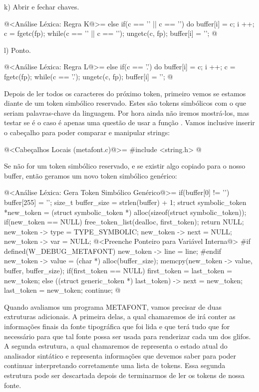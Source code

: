 k) Abrir e fechar chaves.

\iniciocodigo
@<Análise Léxica: Regra K@>=
else if(c == '{' || c == '}'){
  do{
    buffer[i] = c;
    i ++;
    c = fgetc(fp);
  } while(c == '{' || c == '}');
  ungetc(c, fp);
  buffer[i] = '\0';
}
@
\fimcodigo

l) Ponto.

\iniciocodigo
@<Análise Léxica: Regra L@>=
else if(c == '.'){
  do{
    buffer[i] = c;
    i ++;
    c = fgetc(fp);
  } while(c == '.');
  ungetc(c, fp);
  buffer[i] = '\0';
}
@
\fimcodigo


Depois de ler todos os caracteres do próximo token, primeiro vemos se
estamos diante de um token simbólico reservado. Estes são tokens
simbólicos com o que seriam palavras-chave da linguagem. Por hora
ainda não iremos mostrá-los, mas testar se é o caso é apenas uma
questão de usar a função . Vamos inclusive inserir
o cabeçalho para poder comparar e manipular strings:

\iniciocodigo
@<Cabeçalhos Locais (metafont.c)@>=
#include <string.h>
@
\fimcodigo

Se não for um token simbólico reservado, e se existir algo copiado
para o nosso buffer, então geramos um novo token simbólico genérico:

\iniciocodigo
@<Análise Léxica: Gera Token Simbólico Genérico@>=
if(buffer[0] != '\0'){
  buffer[255] = '\0';
  size_t buffer_size = strlen(buffer) + 1;
  struct symbolic_token *new_token =
     (struct symbolic_token *) alloc(sizeof(struct symbolic_token));
  if(new_token == NULL){
    free_token_list(dealloc, first_token);
    return NULL;
  }
  new_token -> type = TYPE_SYMBOLIC;
  new_token -> next = NULL;
  new_token -> var = NULL;
  @<Preenche Ponteiro para Variável Interna@>
#if defined(W_DEBUG_METAFONT)
  new_token -> line = line;
#endif
  new_token -> value = (char *) alloc(buffer_size);
  memcpy(new_token -> value, buffer, buffer_size);
  if(first_token == NULL)
    first_token = last_token = new_token;
  else{
    ((struct generic_token *) last_token) -> next = new_token;
    last_token = new_token;
  }
  continue;
}
@
\fimcodigo



Quando avaliamos um programa METAFONT, vamos precisar de duas
extruturas adicionais. A primeira delas, a qual chamaremos
de  irá conter as informações finais da
fonte tipográfica que foi lida e que terá tudo que for necessário para
que tal fonte possa ser usada para renderizar cada um dos glifos. A
segunda estrutura, a qual chamaremos de 
representa o estado atual do analisador sintático e representa
informações que devemos saber para poder continuar interpretando
corretamente uma lista de tokens. Essa segunda estrutura pode ser
descartada depois de terminarmos de ler os tokens de nossa fonte.

